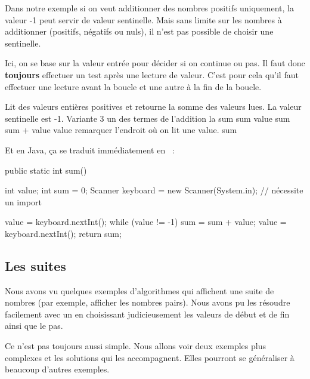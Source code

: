 		Dans notre exemple si on veut additionner des nombres positifs
		uniquement, la valeur -1 peut servir de valeur sentinelle. Mais sans
		limite sur les nombres à additionner (positifs, négatifs ou nuls), il
		n’est pas possible de choisir une sentinelle.

		Ici, on se base sur la valeur entrée pour décider si on continue ou pas.
		Il faut donc \textbf{toujours} effectuer un test après une lecture de
		valeur. C’est pour cela qu’il faut effectuer une lecture avant la boucle
		et une autre à la fin de la boucle.

		\begin{pseudocode}
		\LComment Lit des valeurs entières positives et retourne la somme des valeurs lues.
		\LComment La valeur sentinelle est -1.
		 \RComment Variante 3
			 \RComment un des termes de l’addition
			 \RComment la sum
			\Let sum 
			\Read value
				\Let sum \Gets sum + value 
				\Read value \RComment remarquer l’endroit où on lit une value.
			\EndWhile
			\Return sum
		\EndAlgo
		\end{pseudocode}

		Et en Java, ça se traduit immédiatement en ~:

		\begin{java}
public static int sum(){
	int value;
	int sum = 0;
	Scanner keyboard = new Scanner(System.in); // nécessite un import

	value = keyboard.nextInt();
	while (value != -1){
		sum = sum + value;
		value = keyboard.nextInt();
	}
	return sum;
}	
		\end{java}

\subsection{Les suites}

	Nous avons vu quelques exemples d’algorithmes qui affichent une suite de
	nombres (par exemple, afficher les nombres pairs).  Nous avons pu les
	résoudre facilement avec un \pc{\algorithmicfor} en choisissant
	judicieusement les valeurs de début et de fin ainsi que le pas.
	
	Ce n’est pas toujours aussi simple.  Nous allons voir deux exemples plus
	complexes et les solutions qui les accompagnent.  Elles pourront se
	généraliser à beaucoup d’autres exemples.
	
